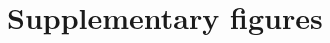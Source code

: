 \documentclass[times, twoside, watermark]{zHenriquesLab-StyleBioRxiv}
\begin{document}
\newpage
\section{Supplementary figures} \label{supfigs:SUPP FIGS}

\renewcommand{\thefigure}{S\arabic{figure}}

\setcounter{figure}{0}

\end{document}
